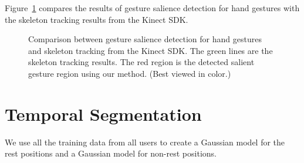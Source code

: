 \documentclass{acm_proc_article-sp}
\begin{document}
Figure~\ref{fig:compare-skeleton} compares the results of gesture salience detection for hand gestures with the skeleton tracking results
from the Kinect SDK.
\begin{figure}
\centering
{}
\caption{Comparison between gesture salience detection for hand gestures and skeleton tracking from the Kinect SDK. The green lines are
the skeleton tracking results. The red region is the detected salient gesture
region using our method. (Best viewed in color.)}
\label{fig:compare-skeleton}
\end{figure}

\section{Temporal Segmentation}\label{sec:recognition}
We use all the training data from all users to create a Gaussian model for the rest 
positions and a Gaussian model for non-rest positions.
\end{document}

